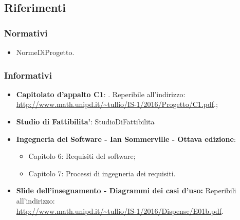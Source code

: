 \subsection{Riferimenti}

\subsubsection{Normativi}

\begin{itemize}
	
	\item NormeDiProgetto.
	
\end{itemize}

\subsubsection{Informativi}
\begin{itemize}
	\item
	\textbf{Capitolato d'appalto C1}: \progetto. Reperibile all'indirizzo: \\
	\url{http://www.math.unipd.it/~tullio/IS-1/2016/Progetto/C1.pdf}.;
	\item 	
	\textbf{Studio di Fattibilita'}: StudioDiFattibilita
	\item
	\textbf{Ingegneria del Software - Ian Sommerville - Ottava edizione}:
	\begin{itemize}
		\item Capitolo 6: Requisiti del software;
		\item Capitolo 7: Processi di ingegneria dei requisiti.
	\end{itemize} 
	\item
	\textbf{Slide dell’insegnamento - Diagrammi dei casi d’uso:}  Reperibili all'indirizzo: \\ \url{http://www.math.unipd.it/~tullio/IS-1/2016/Dispense/E01b.pdf}.
\end{itemize}